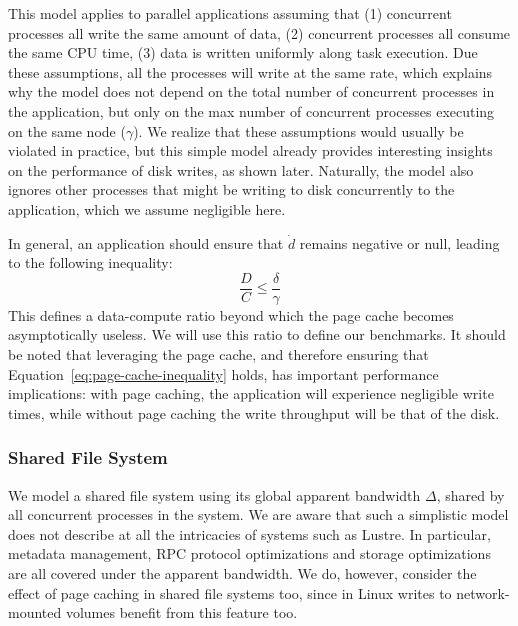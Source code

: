 \documentclass{IEEEtran}
\newcommand{\todo}[1]{\marginpar{\parbox{18mm}{\flushleft\tiny\color{red}\textbf{TODO}:
      #1}}}
\begin{document}
This model applies to parallel applications assuming that (1) 
concurrent processes all write the same amount of data, (2) 
concurrent processes all consume the same CPU time, (3) data is written 
uniformly along task execution. Due these assumptions, all the 
processes will write at the same rate, which explains why the model 
does not depend on the total number of concurrent processes in the 
application, but only on the max number of concurrent processes 
executing on the same node ($\gamma$). We realize that these 
assumptions would usually be violated in practice, but this simple 
model already provides interesting insights on the performance of disk 
writes, as shown later. Naturally, the model also ignores other 
processes that might be writing to disk concurrently to the 
application, which we assume negligible here. 

In general, an application should ensure that $\dot d$ remains negative 
or null, leading to the following inequality:
\begin{equation}
\frac{D}{C} \leq \frac{\delta}{\gamma} \label{eq:page-cache-inequality}
\end{equation}
This defines a data-compute ratio beyond which the page cache becomes 
asymptotically useless. We will use this ratio to define our benchmarks. It 
should be noted that leveraging the page cache, and therefore ensuring 
that Equation~\ref{eq:page-cache-inequality} holds, has important 
performance implications: with page caching, the application will 
experience negligible write times, while without page caching 
the write throughput will be that of the disk.


\todo{How about reads?}

\subsubsection{Shared File System}

We model a shared file system using its global apparent bandwidth 
$\Delta$, shared by all concurrent processes in the system. We are 
aware that such a simplistic model does not describe at all the 
intricacies of systems such as Lustre. In particular, metadata 
management, RPC protocol optimizations and storage optimizations are 
all covered under the apparent bandwidth. We do, however, consider the 
effect of page caching in shared file systems too, since in Linux 
writes to network-mounted volumes benefit from this feature too.
\end{document}
